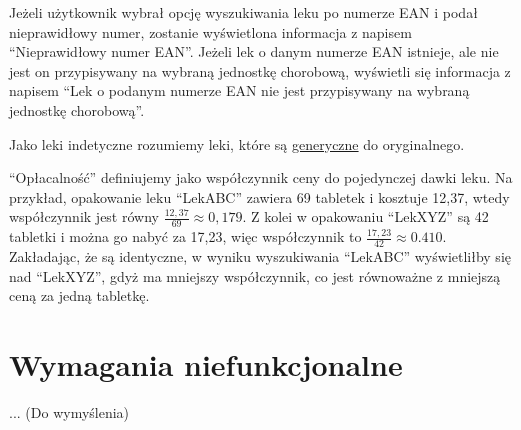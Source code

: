 \documentclass{article}
\begin{document}
  Jeżeli użytkownik wybrał opcję wyszukiwania leku po numerze EAN i podał nieprawidłowy numer, zostanie wyświetlona informacja z napisem
  ``Nieprawidłowy numer EAN''.
  Jeżeli lek o danym numerze EAN istnieje, ale nie jest on przypisywany na wybraną jednostkę chorobową, wyświetli się informacja z napisem
  ``Lek o podanym numerze EAN nie jest przypisywany na wybraną jednostkę chorobową''.

  Jako leki indetyczne rozumiemy leki, które są
  \href{https://www.eupati.eu/pl/rodzaje-lekow/leki-generyczne/}{generyczne} do oryginalnego.

  ``Opłacalność'' definiujemy jako współczynnik ceny do pojedynczej dawki leku.
  Na przykład, opakowanie leku ``LekABC'' zawiera 69 tabletek i kosztuje 12,37, wtedy współczynnik jest równy $\frac{12,37}{69} \approx 0,179$.
  Z kolei w opakowaniu ``LekXYZ'' są 42 tabletki i można go nabyć za 17,23, więc współczynnik to $\frac{17,23}{42} \approx 0.410$.
  Zakładając, że są identyczne, w wyniku wyszukiwania ``LekABC'' wyświetliłby się nad ``LekXYZ'', gdyż ma mniejszy współczynnik,
  co jest równoważne z mniejszą ceną za jedną tabletkę.

  \section{Wymagania niefunkcjonalne}

  ... (Do wymyślenia)
\end{document}
